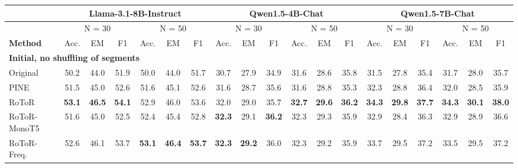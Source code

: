 \begin{table*}[t]
\centering
\resizebox{0.95\linewidth}{!}
{
\begin{tabular}{@{}lcccccccccccccccccc@{}}
\toprule
\multicolumn{1}{l|}{} & \multicolumn{6}{c|}{Llama-3.1-8B-Instruct} & \multicolumn{6}{c|}{Qwen1.5-4B-Chat} & \multicolumn{6}{c}{Qwen1.5-7B-Chat} \\ \midrule
\multicolumn{1}{l|}{} & \multicolumn{3}{c|}{N = 30} & \multicolumn{3}{c|}{N = 50} & \multicolumn{3}{c|}{N = 30} & \multicolumn{3}{c|}{N = 50} & \multicolumn{3}{c|}{N = 30} & \multicolumn{3}{c}{N = 50} \\ \cmidrule(l){2-19} 
\multicolumn{1}{l|}{\textbf{Method}} & Acc. & EM & \multicolumn{1}{c|}{F1} & Acc. & EM & \multicolumn{1}{c|}{F1} & Acc. & EM & \multicolumn{1}{c|}{F1} & Acc. & EM & \multicolumn{1}{c|}{F1} & Acc. & EM & \multicolumn{1}{c|}{F1} & Acc. & EM & F1 \\ \midrule
\multicolumn{19}{l}{\textbf{Initial, no shuffling of segments}} \\ \midrule
\multicolumn{1}{l|}{Original} & 50.2 & 44.0 & \multicolumn{1}{c|}{51.9} & 50.0 & 44.0 & \multicolumn{1}{c|}{51.7} & 30.7 & 27.9 & \multicolumn{1}{c|}{34.9} & 31.6 & 28.6 & \multicolumn{1}{c|}{35.8} & 31.5 & 27.8 & \multicolumn{1}{c|}{35.4} & 31.7 & 28.0 & 35.7 \\
\multicolumn{1}{l|}{PINE} & 51.5 & 45.0 & \multicolumn{1}{c|}{52.6} & 51.6 & 45.1 & \multicolumn{1}{c|}{52.6} & 31.6 & 28.7 & \multicolumn{1}{c|}{35.6} & 31.6 & 28.8 & \multicolumn{1}{c|}{35.3} & 32.3 & 28.8 & \multicolumn{1}{c|}{36.4} & 32.0 & 28.5 & 35.9 \\
\multicolumn{1}{l|}{RoToR} & \textbf{53.1} & \textbf{46.5} & \multicolumn{1}{c|}{\textbf{54.1}} & 52.9 & 46.0 & \multicolumn{1}{c|}{53.6} & 32.0 & 29.0 & \multicolumn{1}{c|}{35.7} & \textbf{32.7} & \textbf{29.6} & \multicolumn{1}{c|}{\textbf{36.2}} & \textbf{34.3} & \textbf{29.8} & \multicolumn{1}{c|}{\textbf{37.7}} & \textbf{34.3} & \textbf{30.1} & \textbf{38.0} \\
\multicolumn{1}{l|}{RoToR-MonoT5} & 51.6 & 45.0 & \multicolumn{1}{c|}{52.5} & 52.4 & 45.4 & \multicolumn{1}{c|}{52.8} & \textbf{32.3} & 29.1 & \multicolumn{1}{c|}{\textbf{36.2}} & 32.3 & 29.3 & \multicolumn{1}{c|}{35.9} & 32.9 & 28.4 & \multicolumn{1}{c|}{36.3} & 32.9 & 28.9 & 36.6 \\
\multicolumn{1}{l|}{RoToR-Freq.} & 52.6 & 46.1 & \multicolumn{1}{c|}{53.7} & \textbf{53.1} & \textbf{46.4} & \multicolumn{1}{c|}{\textbf{53.7}} & \textbf{32.3} & \textbf{29.2} & \multicolumn{1}{c|}{36.0} & 32.3 & 29.2 & \multicolumn{1}{c|}{35.9} & 33.7 & 29.5 & \multicolumn{1}{c|}{37.2} & 33.5 & 29.5 & 37.2 \\ \midrule

\end{tabular}}
\end{table*}
